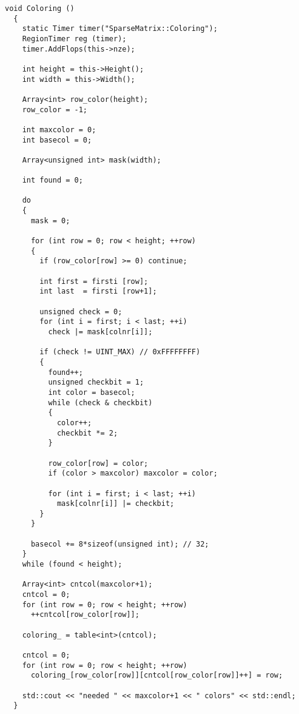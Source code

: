 \documentclass[a4paper,11pt]{scrartcl}
\begin{document}
\begin{lstlisting}
void Coloring ()
  {
    static Timer timer("SparseMatrix::Coloring");
    RegionTimer reg (timer);
    timer.AddFlops(this->nze);

    int height = this->Height();
    int width = this->Width();

    Array<int> row_color(height);
    row_color = -1;

    int maxcolor = 0;
    int basecol = 0;

    Array<unsigned int> mask(width);

    int found = 0;

    do
    {
      mask = 0;

      for (int row = 0; row < height; ++row)
      {
        if (row_color[row] >= 0) continue;

        int first = firsti [row];
        int last  = firsti [row+1];

        unsigned check = 0;
        for (int i = first; i < last; ++i)
          check |= mask[colnr[i]];

        if (check != UINT_MAX) // 0xFFFFFFFF)
        {
          found++;
          unsigned checkbit = 1;
          int color = basecol;
          while (check & checkbit)
          {
            color++;
            checkbit *= 2;
          }

          row_color[row] = color;
          if (color > maxcolor) maxcolor = color;

          for (int i = first; i < last; ++i)
            mask[colnr[i]] |= checkbit;
        }
      }

      basecol += 8*sizeof(unsigned int); // 32;
    }
    while (found < height);

    Array<int> cntcol(maxcolor+1);
    cntcol = 0;
    for (int row = 0; row < height; ++row)
      ++cntcol[row_color[row]];

    coloring_ = table<int>(cntcol);

    cntcol = 0;
    for (int row = 0; row < height; ++row)
      coloring_[row_color[row]][cntcol[row_color[row]]++] = row;

    std::cout << "needed " << maxcolor+1 << " colors" << std::endl;
  }

\end{lstlisting}
\end{document}
